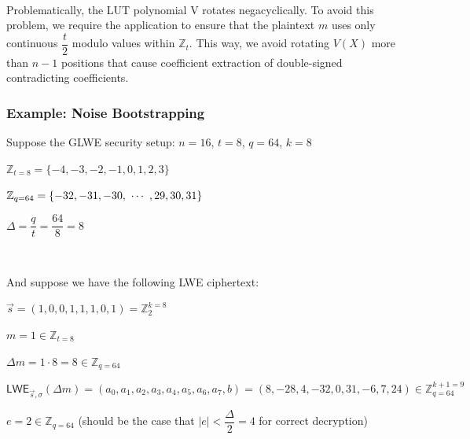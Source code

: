 \begin{tcolorbox}[title={\textbf{\tboxlabel{\ref*{subsec:tfhe-summary}} TFHE Noise Bootstrapping Procedure}}]
\begin{enumerate}



\end{enumerate}

$ $

 Problematically, the LUT polynomial V rotates negacyclically. To avoid this problem, we require the application to ensure that the plaintext $m$ uses only continuous $\dfrac{t}{2}$ modulo values within $\mathbb{Z}_t$. This way, we avoid rotating $V(X)$ more than $n-1$ positions that cause coefficient extraction of double-signed contradicting coefficients. 
\end{tcolorbox}


\subsubsection{Example: Noise Bootstrapping}
\label{subsec:tfhe-noise-bootstrapping-ex}

Suppose the GLWE security setup: $n = 16$, $t = 8$, $q = 64$, $k = 8$

$\mathbb{Z}_{t=8} = \{-4, -3, -2, -1, 0 , 1, 2, 3\}$

$\mathbb{Z}_{q=64} = \{ -32, -31, -30, \text{ } \text{$\cdots$} \text{ }, 29, 30, 31 \}$

$\Delta = \dfrac{q}{t} = \dfrac{64}{8} = 8$

$ $

And suppose we have the following LWE ciphertext:

$\vec{s} = (1, 0, 0, 1, 1, 1, 0, 1) = \mathbb{Z}_2^{k=8}$

$m = 1  \in \mathbb{Z}_{t=8}$

$\Delta m = 1 \cdot 8 = 8 \in \mathbb{Z}_{q=64}$



$\textsf{LWE}_{\vec{s}, \sigma}(\Delta m) = (a_0, a_1, a_2, a_3, a_4, a_5, a_6, a_7, b) 
= (8, -28, 4, -32, 0, 31, -6, 7, 24) \in \mathbb{Z}_{q=64}^{k+1=9}$

$e = 2 \in \mathbb{Z}_{q=64}$ (should be the case that $|e| < \dfrac{\Delta}{2} = 4$ for correct decryption)

